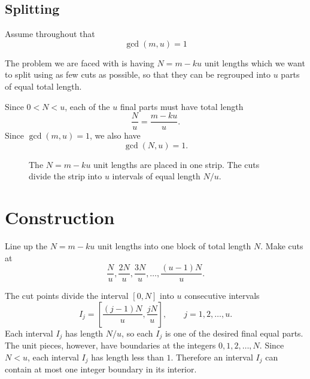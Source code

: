 \documentclass[11pt]{article}
\begin{document}
\subsection{Splitting}

Assume throughout that
\[
\gcd(m,u)=1
\]

The problem we are faced with is having \(N = m-ku\) unit lengths which we want to split using as few cuts as possible, so that they can be regrouped into \(u\) parts of equal total length.

Since \(0<N<u\), each of the \(u\) final parts must have total length
\[
\frac{N}{u}
=\frac{m-ku}{u}.
\]
Since \(\gcd(m,u)=1\), we also have
\[
\gcd(N,u)=1.
\]

\begin{figure}[h]
\centering
{}
\caption{The \(N=m-ku\) unit lengths are placed in one strip. The cuts divide the strip into \(u\) intervals of equal length \(N/u\).}
\end{figure}


\section*{Construction}

Line up the \(N=m-ku\) unit lengths into one block of total length \(N\). Make cuts at
\[
\frac{N}{u},\frac{2N}{u},\frac{3N}{u},\ldots,\frac{(u-1)N}{u}.
\]

The cut points divide the interval \([0,N]\) into \(u\) consecutive intervals
\[
I_j=\left[\frac{(j-1)N}{u},\frac{jN}{u}\right],
\qquad
j=1,2,\ldots,u.
\]
Each interval \(I_j\) has length \(N/u\), so each \(I_j\) is one of the desired final equal parts.
The unit pieces, however, have boundaries at the integers $0,1,2,\ldots,N$.
Since \(N<u\), each interval \(I_j\) has length less than \(1\). Therefore an interval \(I_j\) can contain at most one integer boundary in its interior.
\end{document}
